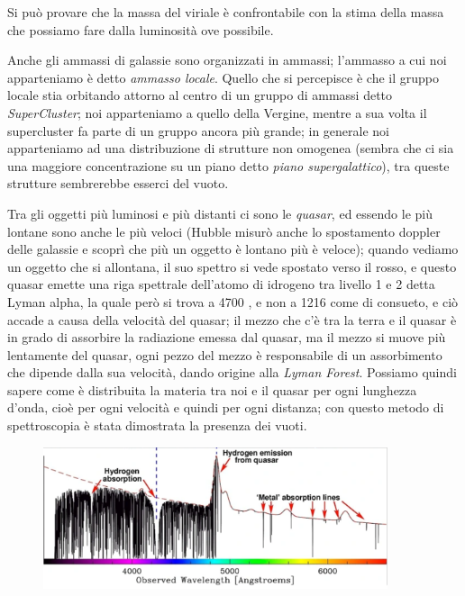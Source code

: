 Si può provare che la massa del viriale è confrontabile con la stima della massa che possiamo fare dalla luminosità ove possibile.

\vspace{0.2cm}Anche gli ammassi di galassie sono organizzati in ammassi; l'ammasso a cui noi apparteniamo è detto \textit{ammasso locale}. Quello che si percepisce è che il gruppo locale stia orbitando attorno al centro di un gruppo di ammassi detto \textit{SuperCluster}; noi apparteniamo a quello della Vergine, mentre a sua volta il supercluster fa parte di un gruppo ancora più grande; in generale noi apparteniamo ad una distribuzione di strutture non omogenea (sembra che ci sia una maggiore concentrazione su un piano detto \textit{piano supergalattico}), tra queste strutture sembrerebbe esserci del vuoto.

Tra gli oggetti più luminosi e più distanti ci sono le \textit{quasar}, ed essendo le più lontane sono anche le più veloci (Hubble misurò anche lo spostamento doppler delle galassie e scoprì che più un oggetto è lontano più è veloce); quando vediamo un oggetto che si allontana, il suo spettro si vede spostato verso il rosso, e questo quasar emette una riga spettrale dell'atomo di idrogeno tra livello 1 e 2 detta Lyman alpha, la quale però si trova a 4700 \A, e non a 1216 \A come di consueto, e ciò accade a causa della velocità del quasar; il mezzo che c'è tra la terra e il quasar è in grado di assorbire la radiazione emessa dal quasar, ma il mezzo si muove più lentamente del quasar, ogni pezzo del mezzo è responsabile di un assorbimento che dipende dalla sua velocità, dando origine alla \textit{Lyman Forest}. Possiamo quindi sapere come è distribuita la materia tra noi e il quasar per ogni lunghezza d'onda, cioè per ogni velocità e quindi per ogni distanza; con questo metodo di spettroscopia è stata dimostrata la presenza dei vuoti.

\begin{figure} [H]
    \centering
    \includegraphics[width=0.9\textwidth]{immagini_lezioni12-12/44.png}
\end{figure}

